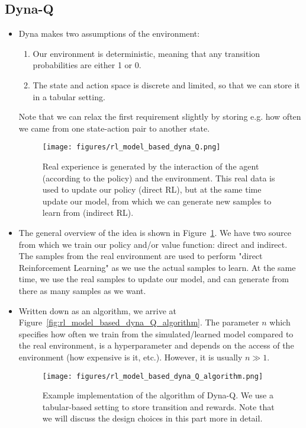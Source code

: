 \subsection{Dyna-Q}
\begin{itemize}
	\item Dyna makes two assumptions of the environment:
	\begin{enumerate}
		\item Our environment is deterministic, meaning that any transition probabilities are either 1 or 0. 
		\item The state and action space is discrete and limited, so that we can store it in a tabular setting.
	\end{enumerate}
	Note that we can relax the first requirement slightly by storing e.g. how often we came from one state-action pair to another state.
	\begin{figure}[ht!]
		\centering
		\texttt{[image: figures/rl\_model\_based\_dyna\_Q.png]}
		\caption{Real experience is generated by the interaction of the agent (according to the policy) and the environment. This real data is used to update our policy (direct RL), but at the same time update our model, from which we can generate new samples to learn from (indirect RL).}
		\label{fig:rl_model_based_dyna_Q}
	\end{figure}
	\item The general overview of the idea is shown in Figure~\ref{fig:rl_model_based_dyna_Q}. We have two source from which we train our policy and/or value function: direct and indirect. The samples from the real environment are used to perform "direct Reinforcement Learning" as we use the actual samples to learn. At the same time, we use the real samples to update our model, and can generate from there as many samples as we want.
	\item Written down as an algorithm, we arrive at Figure~\ref{fig:rl_model_based_dyna_Q_algorithm}. The parameter $n$ which specifies how often we train from the simulated/learned model compared to the real environment, is a hyperparameter and depends on the access of the environment (how expensive is it, etc.). However, it is usually $n\gg 1$.
	\begin{figure}[ht!]
		\centering
		\texttt{[image: figures/rl\_model\_based\_dyna\_Q\_algorithm.png]}
		\caption{Example implementation of the algorithm of Dyna-Q. We use a tabular-based setting to store transition and rewards. Note that we will discuss the design choices in this part more in detail.}

\end{figure}
\end{itemize}
